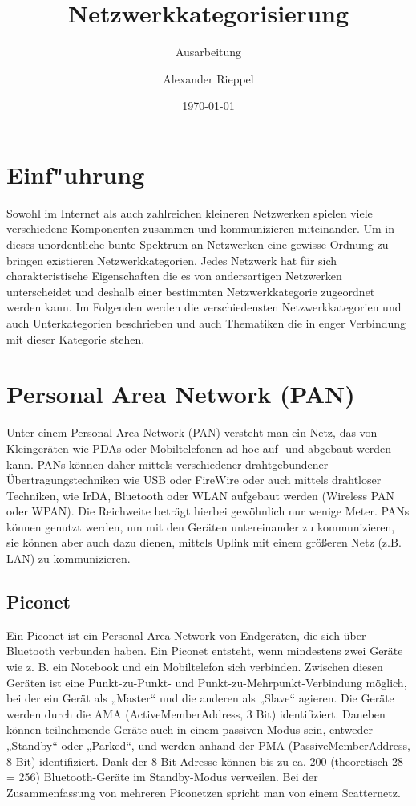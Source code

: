\documentclass[a4paper,14pt]{scrreprt}
\begin{document}
\author{Alexander Rieppel} %
\title{Netzwerkkategorisierung} %
\subject{NWSY} %
\subtitle{Ausarbeitung} %
\date{\today} %
\publishers{5AHITT} %

\maketitle
\tableofcontents
 

\chapter{Einf"uhrung}
Sowohl im Internet als auch zahlreichen kleineren Netzwerken spielen viele verschiedene Komponenten zusammen und kommunizieren miteinander. Um in dieses unordentliche bunte Spektrum an Netzwerken eine gewisse Ordnung zu bringen existieren Netzwerkkategorien. Jedes Netzwerk hat für sich charakteristische Eigenschaften die es von andersartigen Netzwerken unterscheidet und deshalb einer bestimmten Netzwerkkategorie zugeordnet werden kann. Im Folgenden werden die verschiedensten Netzwerkkategorien und auch Unterkategorien beschrieben und auch Thematiken die in enger Verbindung mit dieser Kategorie stehen. 
\chapter{Personal Area Network (PAN)}
Unter einem Personal Area Network (PAN) versteht man ein Netz, das von Kleingeräten wie PDAs oder Mobiltelefonen ad hoc auf- und abgebaut werden kann. PANs können daher mittels verschiedener drahtgebundener Übertragungstechniken wie USB oder FireWire oder auch mittels drahtloser Techniken, wie IrDA, Bluetooth oder WLAN aufgebaut werden (Wireless PAN oder WPAN). Die Reichweite beträgt hierbei gewöhnlich nur wenige Meter. PANs können genutzt werden, um mit den Geräten untereinander zu kommunizieren, sie können aber auch dazu dienen, mittels Uplink mit einem größeren Netz (z.B. LAN) zu kommunizieren. 
\section{Piconet}
Ein Piconet ist ein Personal Area Network von Endgeräten, die sich über Bluetooth verbunden haben. Ein Piconet entsteht, wenn mindestens zwei Geräte wie z. B. ein Notebook und ein Mobiltelefon sich verbinden. Zwischen diesen Geräten ist eine Punkt-zu-Punkt- und Punkt-zu-Mehrpunkt-Verbindung möglich, bei der ein Gerät als „Master“ und die anderen als „Slave“ agieren. Die Geräte werden durch die AMA (ActiveMemberAddress, 3 Bit) identifiziert. Daneben können teilnehmende Geräte auch in einem passiven Modus sein, entweder „Standby“ oder „Parked“, und werden anhand der PMA (PassiveMemberAddress, 8 Bit) identifiziert. Dank der 8-Bit-Adresse können bis zu ca. 200 (theoretisch 28 = 256) Bluetooth-Geräte im Standby-Modus verweilen. Bei der Zusammenfassung von mehreren Piconetzen spricht man von einem Scatternetz.
\end{document}
